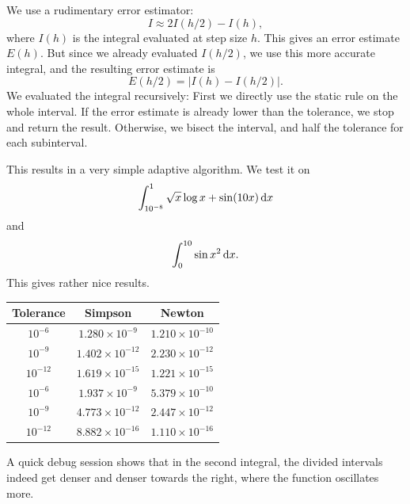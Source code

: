 \documentclass{homework}
\begin{document}
\begin{problem}
We use a rudimentary error estimator:
\[I \approx 2I(h/2) - I(h),\]
where \(I(h)\) is the integral evaluated at step size \(h\). This gives an error estimate \(E(h)\). But since we already evaluated \(I(h/2)\), we use this more accurate integral, and the resulting error estimate is
\[E(h/2) = \left|I(h) - I(h/2) \right|.\]
We evaluated the integral recursively: First we directly use the static rule on the whole interval. If the error estimate is already lower than the tolerance, we stop and return the result. Otherwise, we bisect the interval, and half the tolerance for each subinterval.

This results in a very simple adaptive algorithm. We test it on
\[\int_{10^{-8}}^1 \sqrt x \log x+ \sin(10x) \d[x]\]
and
\[\int_0^{10} \sin x^2 \d[x].\]
This gives rather nice results.
\begin{center}
\begin{tabular}{c c c}
Tolerance & Simpson & Newton\\\hline
\(10^{-6}\) & \(1.280 \times 10^{-9}\) & \(1.210 \times 10^{-10}\)\\
\(10^{-9}\) & \(1.402 \times 10^{-12}\) & \(2.230 \times 10^{-12}\)\\
\(10^{-12}\) & \(1.619 \times 10^{-15}\) & \(1.221 \times 10^{-15}\)\\[1ex]
\(10^{-6}\) & \(1.937 \times 10^{-9}\) & \(5.379 \times 10^{-10}\)\\
\(10^{-9}\) & \(4.773 \times 10^{-12}\) & \(2.447 \times 10^{-12}\)\\
\(10^{-12}\) & \(8.882 \times 10^{-16}\) & \(1.110 \times 10^{-16}\)\\
\end{tabular}
\end{center}
A quick debug session shows that in the second integral, the divided intervals indeed get denser and denser towards the right, where the function oscillates more.
\end{problem}
\end{document}
